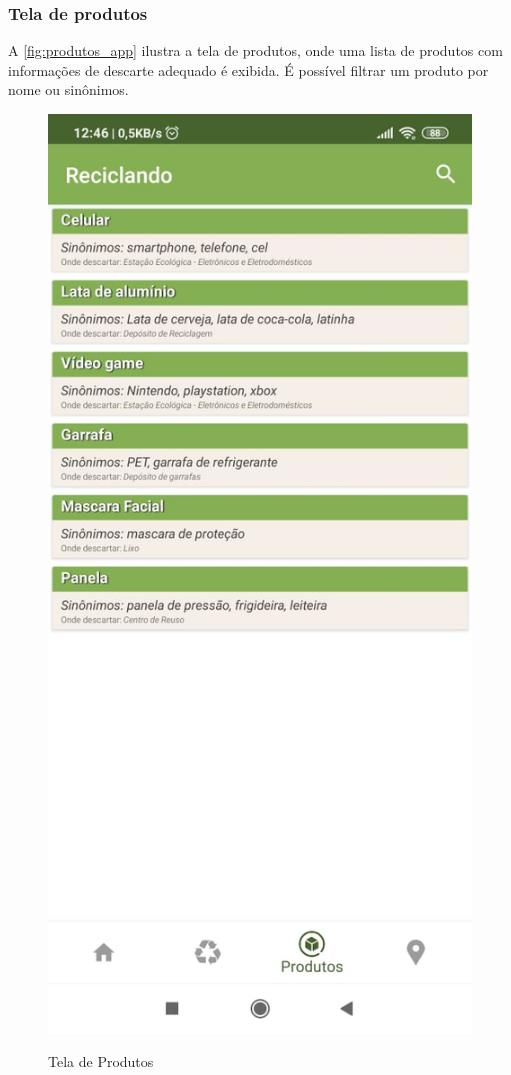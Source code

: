 \documentclass[
	12pt,				%
	openany,			%
	twoside,			%
	a4paper,			%
	english,			%
	french,				%
	spanish,			%
	brazil				%
	]{abntex2}
\begin{document}
\newpage

\subsubsection{Tela de produtos}
A \autoref{fig:produtos_app} ilustra a tela de produtos, onde uma lista de produtos com informações de descarte adequado é exibida. É possível filtrar um produto por nome ou sinônimos.



\begin{figure}[htb]    
 \centering
  \begin{minipage}{0.55\textwidth}
    \centering
    \caption{Tela de Produtos}
    \includegraphics[scale=0.35]{media/produtos_app.jpeg}
     \label{fig:produtos_app}
  \end{minipage}
  \hfill
\end{figure}
\end{document}
